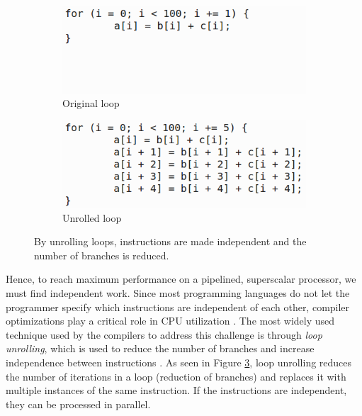 \begin{figure}
  \centering
  \begin{subfigure}{0.45\textwidth}
    \includegraphics[width=\textwidth]{img/loop-unrolling-1.png}
    \caption{Original loop}
    \label{fig:loop-unrolling-1} 
  \end{subfigure}
  \begin{subfigure}{0.45\textwidth}
    \includegraphics[width=\textwidth]{img/loop-unrolling-2.png}
    \caption{Unrolled loop}
    \label{fig:loop-unrolling-2} 
  \end{subfigure}
  \caption{By unrolling loops, instructions are made independent and the number of branches is reduced.}
  \label{fig:loop-unrolling} 
\end{figure}
Hence, to reach maximum performance on a pipelined, superscalar processor, we must find independent work. Since most programming languages do not let the programmer specify which instructions are independent of each other, compiler optimizations play a critical role in CPU utilization \cite{Boncz2005-wj}. The most widely used technique used by the compilers to address this challenge is through \textit{loop unrolling}, which is used to reduce the number of branches and increase independence between instructions \cite{Wikipedia_contributors2015-zc}. As seen in Figure \ref{fig:loop-unrolling}, loop unrolling reduces the number of iterations in a loop (reduction of branches) and replaces it with multiple instances of the same instruction. If the instructions are independent, they can be processed in parallel.

